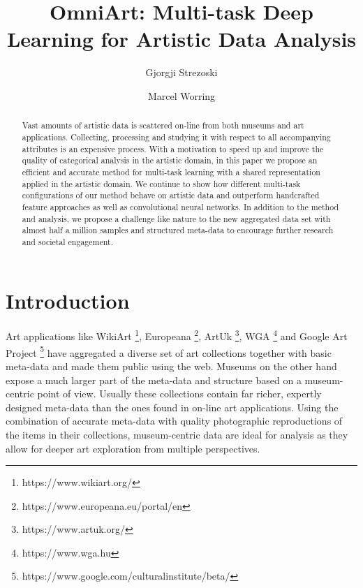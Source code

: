 \documentclass[sigconf]{acmart}
\begin{document}
	\title{OmniArt: Multi-task Deep Learning for Artistic Data Analysis}
	


\author{Gjorgji Strezoski}


\author{Marcel Worring}

\renewcommand{\shortauthors}{G. Strezoski et al.}


\begin{abstract}
	Vast amounts of artistic data is scattered on-line from both museums and art applications. Collecting, processing and studying it with respect to all accompanying attributes is an expensive process. With a motivation to speed up and improve the quality of categorical analysis in the artistic domain, in this paper we propose an efficient and accurate method for multi-task learning with a shared representation applied in the artistic domain. We continue to show how different multi-task configurations of our method behave on artistic data and outperform handcrafted feature approaches as well as convolutional neural networks. In addition to the method and analysis, we propose a challenge like nature to the new aggregated data set with almost half a million samples and structured meta-data to encourage further research and societal engagement. 
\end{abstract}

\maketitle

\section{Introduction}

Art applications like WikiArt \footnote{https://www.wikiart.org/}, Europeana \footnote{https://www.europeana.eu/portal/en}, ArtUk \footnote{https://www.artuk.org/}, WGA \footnote{https://www.wga.hu} and Google Art Project \footnote{https://www.google.com/culturalinstitute/beta/} have aggregated a diverse set of art collections together with basic meta-data and made them public using the web. Museums on the other hand expose a much larger part of the meta-data and structure based on a museum-centric point of view. Usually these collections contain far richer, expertly designed meta-data than the ones found in on-line art applications. Using the combination of accurate meta-data with quality photographic reproductions of the items in their collections, museum-centric data are ideal for analysis as they allow for deeper art exploration from multiple perspectives. 
\end{document}

